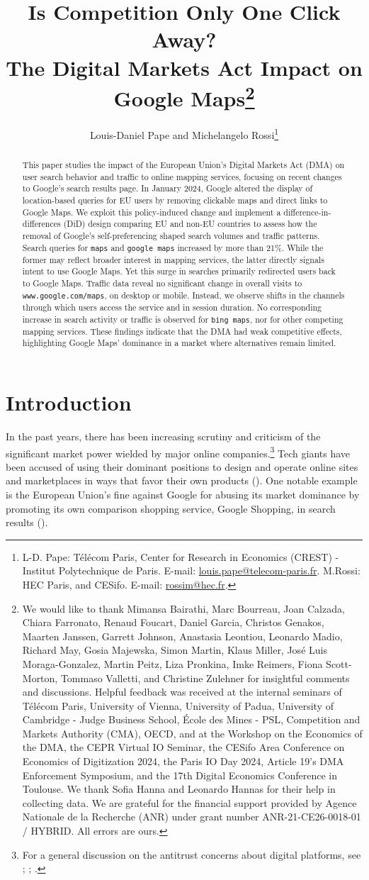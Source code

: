 \documentclass[11pt]{article}
\title{Is Competition Only One Click Away? \\ The Digital Markets Act Impact on Google Maps\thanks{We would like to thank Mimansa Bairathi, Marc Bourreau, Joan Calzada, Chiara Farronato, Renaud Foucart, Daniel Garcia, Christos Genakos, Maarten Janssen, Garrett Johnson, Anastasia Leontiou, Leonardo Madio, Richard May, Gosia Majewska, Simon Martin, Klaus Miller, Jos\'{e} Luis Moraga-Gonzalez, Martin Peitz, Liza Pronkina, Imke Reimers, Fiona Scott-Morton, Tommaso Valletti, and Christine Zulehner for insightful comments and discussions. Helpful feedback was received at the internal seminars of T\'{e}l\'{e}com Paris, University of Vienna, University of Padua, University of Cambridge - Judge Business School, \'{E}cole des Mines - PSL, Competition and Markets Authority (CMA), OECD, and at the Workshop on the Economics of the DMA, the CEPR Virtual IO Seminar, the CESifo Area Conference on Economics of Digitization 2024, the Paris IO Day 2024, Article 19's DMA Enforcement Symposium, and the 17th Digital Economics Conference in Toulouse. We thank Sofia Hanna and Leonardo Hannas for their help in collecting data. We are grateful for the financial support provided by Agence Nationale de la Recherche (ANR) under grant number ANR-21-CE26-0018-01 / HYBRID. All errors are ours.}}
\author{Louis-Daniel Pape and Michelangelo Rossi\thanks{L-D. Pape: T\'{e}l\'{e}com Paris, Center for Research in Economics (CREST) - Institut Polytechnique de Paris. E-mail: \href{mailto:louis.pape@telecom-paris.fr}{louis.pape@telecom-paris.fr}. M.Rossi: HEC Paris, and CESifo. E-mail: \href{mailto:rossim@hec.fr}{rossim@hec.fr}.}}
\begin{document}
\pgfplotsset{compat=1.17}
	\maketitle \vspace{-20pt}
	\begin{abstract} 
		
		This paper studies the impact of the European Union’s Digital Markets Act (DMA) on user search behavior and traffic to online mapping services, focusing on recent changes to Google’s search results page. In January 2024, Google altered the display of location-based queries for EU users by removing clickable maps and direct links to Google Maps. We exploit this policy-induced change and implement a difference-in-differences (DiD) design comparing EU and non-EU countries to assess how the removal of Google’s self-preferencing shaped search volumes and traffic patterns. Search queries for \texttt{maps} and \texttt{google maps} increased by more than 21\%. While the former may reflect broader interest in mapping services, the latter directly signals intent to use Google Maps. Yet this surge in searches primarily redirected users back to Google Maps. Traffic data reveal no significant change in overall visits to \texttt{www.google.com/maps}, on desktop or mobile. Instead, we observe shifts in the channels through which users access the service and in session duration. No corresponding increase in search activity or traffic is observed for \texttt{bing maps}, nor for other competing mapping services. These findings indicate that the DMA had weak competitive effects, highlighting Google Maps’ dominance in a market where alternatives remain limited.
		
	\end{abstract}
	
	\newpage
	
	\section{Introduction}\label{sec:intro}
	
	
	In the past years, there has been increasing scrutiny and criticism of the significant market power wielded by major online companies.\footnote{For a general discussion on the antitrust concerns about digital platforms, see \cite{tucker2019digital}; \cite{stigler2019}; \cite{fletcher2023consumer}.} Tech giants have been accused of using their dominant positions to design and operate online sites and marketplaces in ways that favor their own products (\citealp{cremer2019competition}). One notable example is the European Union’s fine against Google for abusing its market dominance by promoting its own comparison shopping service, Google Shopping, in search results (\citealp{cardoso2017antitrust}). 
	
\end{document}
